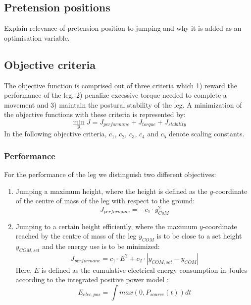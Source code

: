 \documentclass[letterpaper, 10 pt, conference]{ieeeconf}  %
\begin{document}
\subsection{Pretension positions}

Explain relevance of pretension position to jumping and why it is added as an optimisation variable.

\subsection{Objective criteria}

The objective function is comprised out of three criteria which 1) reward the performance of the leg, 2) penalize excessive torque needed to complete a movement and 3) maintain the postural stability of the leg. A minimization of the objective functions with these criteria is represented by:   
 \begin{equation}
\min_{\mathbf{p}}\limits J =  J_{performane}+ J_{torque}+ J_{stability}
 \end{equation}
In the following objective criteria, $c_1$, $c_2$, $c_3$, $c_4$ and $c_5$ denote scaling constants.\\

\subsubsection{Performance}
For the performance of the leg we distinguish two different objectives: 
\begin{enumerate}
	\item Jumping a maximum height, where the height is defined as the $y$-coordinate of the centre of mass of the leg with respect to the ground:
 \begin{equation}
	J_{performane} = -c_1 \cdot y_{CoM}^2
 \end{equation}
	\item Jumping to a certain height efficiently, where the maximum $y$-coordinate reached by the centre of mass of the leg $y_{COM}$ is to be close to a set height $y_{COM,set}$ and the energy use is to be minimized:
 \begin{equation}
	J_{performane} =  c_1 \cdot E^2 + c_2 \cdot |y_{COM,set}-y_{COM}|
 \end{equation}
	Here, $E$ is defined as the cumulative electrical energy consumption in Joules according to the integrated positive power model \cite{verstraten2016energy}:
	 \begin{equation}
	E_{elec,pos} = \int max(0,P_{source}(t))dt
	\end{equation}
\end{enumerate}
\end{document}
